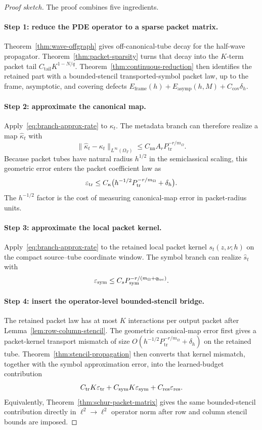 \begin{proof}[Proof sketch]
The proof combines five ingredients.

\paragraph{Step 1: reduce the PDE operator to a sparse packet matrix.}
Theorem~\ref{thm:wave-offgraph} gives off-canonical-tube decay for the half-wave propagator.  Theorem~\ref{thm:packet-sparsity} turns that decay into the $K$-term packet tail $C_{\mathrm{tail}}K^{1-N/q}$.  Theorem~\ref{thm:continuous-reduction} then identifies the retained part with a bounded-stencil transported-symbol packet law, up to the frame, asymptotic, and covering defects $E_{\mathrm{frame}}(h)+E_{\mathrm{asymp}}(h,M)+C_{\mathrm{cov}}\delta_h$.

\paragraph{Step 2: approximate the canonical map.}
Apply~\eqref{eq:branch-approx-rate} to $\kappa_t$.  The metadata branch can therefore realize a map $\widehat\kappa_t$ with
\[
\|\widehat\kappa_t-\kappa_t\|_{L^\infty(\Omega_T)}
\le
C_{\mathrm{nn}}A_rP_{\mathrm{tr}}^{-r/m_\Omega}.
\]
Because packet tubes have natural radius $h^{1/2}$ in the semiclassical scaling, this geometric error enters the packet coefficient law as
\[
\varepsilon_{\mathrm{tr}}
\le
C_\kappa\bigl(h^{-1/2}P_{\mathrm{tr}}^{-r/m_\Omega}+\delta_h\bigr).
\]
The $h^{-1/2}$ factor is the cost of measuring canonical-map error in packet-radius units.

\paragraph{Step 3: approximate the local packet kernel.}
Apply~\eqref{eq:branch-approx-rate} to the retained local packet kernel $s_t(z,\nu;h)$ on the compact source--tube coordinate window.  The symbol branch can realize $\widehat s_t$ with
\[
\varepsilon_{\mathrm{sym}}
\le
C_s P_{\mathrm{sym}}^{-r/(m_\Omega+q_{\mathrm{loc}})}.
\]

\paragraph{Step 4: insert the operator-level bounded-stencil bridge.}
The retained packet law has at most $K$ interactions per output packet after Lemma~\ref{lem:row-column-stencil}.  The geometric canonical-map error first gives a packet-kernel transport mismatch of size $O(h^{-1/2}P_{\mathrm{tr}}^{-r/m_\Omega}+\delta_h)$ on the retained tube.  Theorem~\ref{thm:stencil-propagation} then converts that kernel mismatch, together with the symbol approximation error, into the learned-budget contribution
\[
C_{\mathrm{tr}}K\varepsilon_{\mathrm{tr}}
+C_{\mathrm{sym}}K\varepsilon_{\mathrm{sym}}
+C_{\mathrm{res}}\varepsilon_{\mathrm{res}}.
\]
Equivalently, Theorem~\ref{thm:schur-packet-matrix} gives the same bounded-stencil contribution directly in $\ell^2\to\ell^2$ operator norm after row and column stencil bounds are imposed.


\end{proof}
